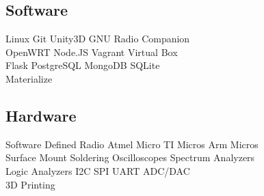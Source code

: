 \documentclass[]{deedy-resume-openfont}
\begin{document}
\begin{minipage}[t]{0.33\textwidth}
\subsection{Software}
Linux \textbullet{} Git \textbullet{} Unity3D \textbullet{} GNU Radio Companion \\
\textbullet{} OpenWRT \textbullet{} Node.JS \textbullet{} Vagrant \textbullet{} Virtual Box \\
\textbullet{} Flask \textbullet{} PostgreSQL \textbullet{} MongoDB \textbullet{} SQLite \\
\textbullet{} Materialize
\sectionsep

\subsection{Hardware}
Software Defined Radio \textbullet{} Atmel Micro \textbullet{} TI Micros \textbullet{} Arm Micros \\
\textbullet{} Surface Mount Soldering \textbullet{} Oscilloscopes \textbullet{} Spectrum Analyzers \\
\textbullet{} Logic Analyzers \textbullet{} I2C \textbullet SPI \textbullet UART \textbullet ADC/DAC\\
\textbullt{} 3D Printing
\sectionsep

%
%

\end{minipage} 
\hfill
\end{document}
